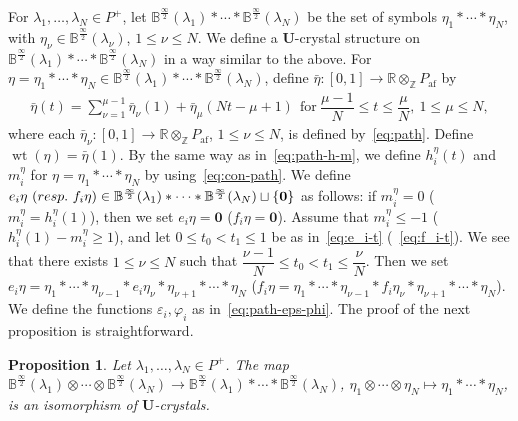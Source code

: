 \documentclass[10pt]{amsart}
\newtheorem{prop}[theo]{Proposition}
\theoremstyle{definition}\newtheorem{defi}[theo]{Definition}
\theoremstyle{remark}\newtheorem{rema}[theo]{Remark}
\newcommand{\BR}{\mathbb{R}}
\newcommand{\BZ}{\mathbb{Z}}
\newcommand\bm[1]{\boldsymbol{#1}}
\newcommand{\U}{\mathbf{U}}
\newcommand{\si}{\frac{\infty}{2}}
\DeclareMathOperator{\af}{af}
\DeclareMathOperator{\wt}{wt}
\begin{document}
For 
$\lambda_1 , \ldots , \lambda_N \in P^+$, 
let 
$\mathbb{B}^{\si}(\lambda_1) * \cdots * \mathbb{B}^{\si}(\lambda_N)$
be the set of symbols
$\eta_1 * \cdots * \eta_N$, 
with 
$\eta_{\nu} \in \mathbb{B}^{\si}(\lambda_{\nu})$, 
$1 \leq \nu \leq N$. 
We define a $\U$-crystal structure on 
$\mathbb{B}^{\si}(\lambda_1) * \cdots * \mathbb{B}^{\si}(\lambda_N)$
in a way similar to the above. For 
$\eta = \eta_1 * \cdots * \eta_N \in \mathbb{B}^{\si}(\lambda_1) * \cdots * \mathbb{B}^{\si}(\lambda_N)$, 
define 
$\bar{\eta} : [0,1] \rightarrow \BR \otimes_{\BZ} P_{\af}$ 
by
\begin{align} \label{eq:con-path}
\bar{\eta} (t) = 
\sum_{\nu = 1}^{\mu - 1} \bar{\eta}_{\nu}(1) + \bar{\eta}_{\mu}(Nt - \mu + 1) 
\ \ 
\text{for} \ 
\dfrac{\mu - 1}{N} \leq t \leq \dfrac{\mu}{N}, \ 
1 \leq \mu \leq N,
\end{align}
where each 
$\bar{\eta}_{\nu} : [0,1] \rightarrow \BR \otimes_{\BZ} P_{\af}$, $1 \leq \nu \leq N$, 
is defined by~\eqref{eq:path}. 
Define 
$\wt (\eta) = \bar{\eta}(1)$. 
By the same way as in~\eqref{eq:path-h-m}, 
we define 
$h_i^{\eta}(t)$ 
and 
$m_i^{\eta}$
for 
$\eta = \eta_1 * \cdots * \eta_N$ 
by using~\eqref{eq:con-path}. 
We define 
$e_i \eta \ (\resp f_i \eta) \in \mathbb{B}^{\si}(\lambda_1) * \cdots * \mathbb{B}^{\si}(\lambda_N) \sqcup \{ \bm{0} \}$ 
as follows: 
if $m_i^{\eta} = 0$ (\resp $m_i^{\eta} = h_i^{\eta} (1) $), then we set $e_i \eta = \bm{0}$ (\resp $f_i \eta = \bm{0}$). 
Assume that 
$m_i^{\eta} \leq -1$ 
(\resp $h_i^{\eta} (1) - m_i^{\eta} \geq 1$), 
and let 
$0 \leq t_0 < t_1 \leq 1$ 
be as in~\eqref{eq:e_i-t} (\resp~\eqref{eq:f_i-t}). 
We see that there exists $1 \leq \nu \leq N$ such that 
$\dfrac{\nu -1}{N} \leq t_0 < t_1 \leq \dfrac{\nu}{N}$. 
Then we set 
$e_i \eta = \eta_1 * \cdots * \eta_{\nu -1} * e_i \eta_{\nu} * \eta_{\nu + 1} * \cdots * \eta_N$ 
(\resp $f_i \eta = \eta_1 * \cdots * \eta_{\nu -1} * f_i \eta_{\nu} * \eta_{\nu + 1} * \cdots * \eta_N$).
We define the functions 
$\varepsilon_i , \varphi_i$ 
as in~\eqref{eq:path-eps-phi}. 
The proof of the next proposition is straightforward.

\begin{prop} \label{prop:conc=tensor}
Let 
$\lambda_1 , \ldots , \lambda_N \in P^+$. 
The map 
$\mathbb{B}^{\si}(\lambda_1) \otimes \cdots \otimes \mathbb{B}^{\si}(\lambda_N)
\rightarrow 
\mathbb{B}^{\si}(\lambda_1) * \cdots * \mathbb{B}^{\si}(\lambda_N)$, 
$\eta_1 \otimes \cdots \otimes \eta_N \mapsto \eta_1 * \cdots * \eta_N$, 
is an isomorphism of $\U$-crystals.
\end{prop}
\end{document}
